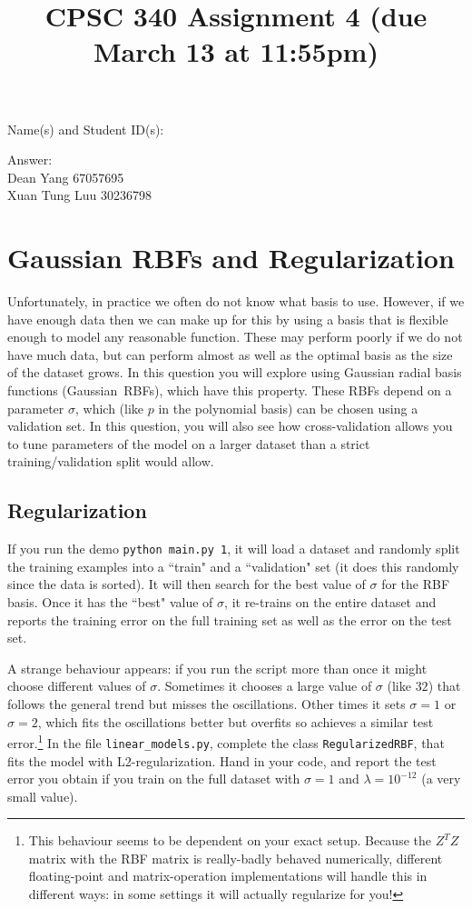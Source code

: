 \documentclass{article}
\def\ans#1{\par\gre{Answer: #1}}
\def\blu#1{{\color{blu}#1}}
\def\gre#1{{\color{gre}#1}}
\def\red#1{{\color{red}#1}}
\begin{document}
\title{CPSC 340 Assignment 4  (\red{due March 13 at 11:55pm)}}
\author{}
\date{}
\maketitle
\vspace{-4em}


\blu{Name(s) and Student ID(s):}
\ans{\\
Dean Yang 67057695\\
Xuan Tung Luu 30236798
}

\section{Gaussian RBFs and Regularization}

Unfortunately, in practice we often do not know what basis to use. However, if we have enough data then we can make up for this by using a basis that is flexible enough to model any reasonable function. These may perform poorly if we do not have much data, but can perform almost as well as the optimal basis as the size of the dataset grows. In this question you will explore using Gaussian radial basis functions (Gaussian~RBFs), which have this property. These RBFs depend on a parameter $\sigma$, which (like $p$ in the polynomial basis) can be chosen using a validation set. In this question, you will also see how cross-validation allows you to tune parameters of the model on a larger dataset than a strict training/validation split would allow.

\subsection{Regularization}

If you run the demo \verb|python main.py 1|, it will load a dataset and randomly split the training examples into a ``train" and a ``validation" set (it does this randomly since the data is sorted). It will then search for the best value of $\sigma$ for the RBF basis. Once it has the ``best" value of $\sigma$, it re-trains on the entire dataset and reports the training error on the full training set as well as the error on the test set.

A strange behaviour appears: if you run the script more than once it might choose different values of $\sigma$. Sometimes it chooses a large value of $\sigma$ (like $32$) that follows the general trend but misses the oscillations. Other times it sets $\sigma = 1$ or $\sigma=2$, which fits the oscillations better but overfits so achieves a similar test error.\footnote{This behaviour seems to be dependent on your exact setup. Because the $Z^TZ$ matrix with the RBF matrix is really-badly behaved numerically, different floating-point and matrix-operation implementations will handle this in different ways: in some settings it will actually regularize for you!} \blu{In the file  \texttt{linear\_models.py}, complete the class \texttt{RegularizedRBF}, that fits the model with L2-regularization. Hand in your code, and report the test error you obtain if you train on the full dataset with $\sigma=1$ and $\lambda = 10^{-12}$ (a very small value).}
\end{document}

